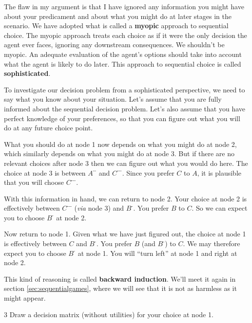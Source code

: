 The flaw in my argument is that I have ignored any information you might have
about your predicament and about what you might do at later stages in the
scenario. We have adopted what is called a \textbf{myopic} approach to
sequential choice. The myopic approach treats each choice as if it were the only
decision the agent ever faces, ignoring any downstream consequences. We
shouldn't be myopic. An adequate evaluation of the agent's options should take
into account what the agent is likely to do later. This approach to sequential
choice is called \textbf{sophisticated}.

To investigate our decision problem from a sophisticated perspective, we need to
say what you know about your situation. Let's assume that you are fully
informed about the sequential decision problem. Let's also assume that you have
perfect knowledge of your preferences, so that you can figure out what you will
do at any future choice point.

What you should do at node 1 now depends on what you might do at node 2, which
similarly depends on what you might do at node 3. But if there are no relevant
choices after node 3 then we can figure out what you would do here. The choice
at node 3 is between $A^{\text{-}\text{-}}$ and $C^{\text{-}\text{-}\text{-}}$.
Since you prefer $C$ to $A$, it is plausible that you will choose
$C^{\text{-}\text{-}\text{-}}$.


With this information in hand, we can return to node 2. Your choice at node 2 is
effectively between $C^{\text{-}\text{-}\text{-}}$ (\emph{via} node 3) and
$B^{\text{-}}$. You prefer $B$ to $C$. So we can expect you to choose
$B^{\text{-}}$ at node 2.

Now return to node 1. Given what we have just figured out, the choice at node 1
is effectively between $C$ and $B^{\text{-}}$. You prefer $B$ (and
$B^{\text{-}}$) to $C$. We may therefore expect you to choose $B^{\text{-}}$ at
node 1. You will ``turn left'' at node 1 and right at node 2.

This kind of reasoning is called \textbf{backward induction}. We'll meet it
again in section \ref{sec:sequentialgames}, where we will see that it is not as
harmless as it might appear.

\begin{exercise}{3}
  Draw a decision matrix (without utilities) for your choice at node 1.
\end{exercise}

